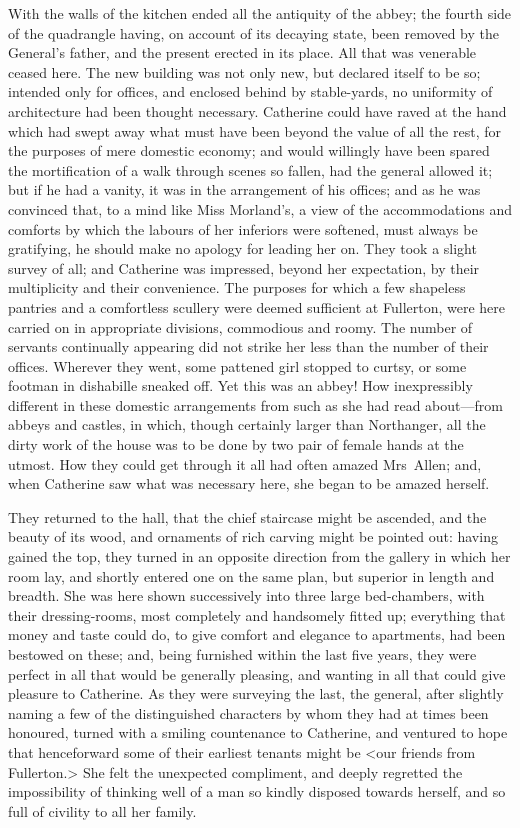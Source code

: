  With the walls of the kitchen ended all the antiquity of the abbey; the fourth side of the quadrangle having, on account of its decaying state, been removed by the General's father, and the present erected in its place. All that was venerable ceased here. The new building was not only new, but declared itself to be so; intended only for offices, and enclosed behind by stable-yards, no uniformity of architecture had been thought necessary. Catherine could have raved at the hand which had swept away what must have been beyond the value of all the rest, for the purposes of mere domestic economy; and would willingly have been spared the mortification of a walk through scenes so fallen, had the general allowed it; but if he had a vanity, it was in the arrangement of his offices; and as he was convinced that, to a mind like Miss Morland's, a view of the accommodations and comforts by which the labours of her inferiors were softened, must always be gratifying, he should make no apology for leading her on. They took a slight survey of all; and Catherine was impressed, beyond her expectation, by their multiplicity and their convenience. The purposes for which a few shapeless pantries and a comfortless scullery were deemed sufficient at Fullerton, were here carried on in appropriate divisions, commodious and roomy. The number of servants continually appearing did not strike her less than the number of their offices. Wherever they went, some pattened girl stopped to curtsy, or some footman in dishabille sneaked off. Yet this was an abbey! How inexpressibly different in these domestic arrangements from such as she had read about—from abbeys and castles, in which, though certainly larger than Northanger, all the dirty work of the house was to be done by two pair of female hands at the utmost. How they could get through it all had often amazed Mrs~Allen; and, when Catherine saw what was necessary here, she began to be amazed herself. 

 They returned to the hall, that the chief staircase might be ascended, and the beauty of its wood, and ornaments of rich carving might be pointed out: having gained the top, they turned in an opposite direction from the gallery in which her room lay, and shortly entered one on the same plan, but superior in length and breadth. She was here shown successively into three large bed-chambers, with their dressing-rooms, most completely and handsomely fitted up; everything that money and taste could do, to give comfort and elegance to apartments, had been bestowed on these; and, being furnished within the last five years, they were perfect in all that would be generally pleasing, and wanting in all that could give pleasure to Catherine. As they were surveying the last, the general, after slightly naming a few of the distinguished characters by whom they had at times been honoured, turned with a smiling countenance to Catherine, and ventured to hope that henceforward some of their earliest tenants might be <our friends from Fullerton.> She felt the unexpected compliment, and deeply regretted the impossibility of thinking well of a man so kindly disposed towards herself, and so full of civility to all her family. 

